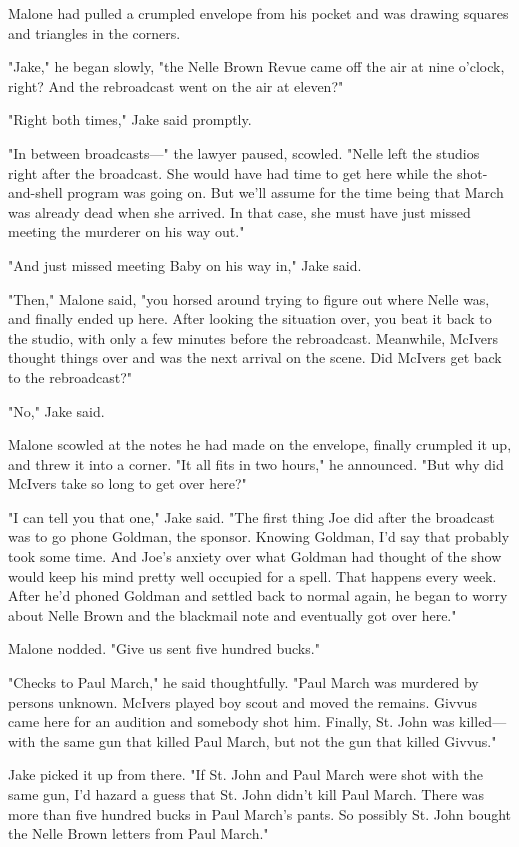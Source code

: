 \documentclass{novel}
\begin{document}
Malone had pulled a crumpled envelope from his pocket and was drawing squares and triangles in the corners.

"Jake," he began slowly, "the Nelle Brown Revue came off the air at nine o'clock, right? And the rebroadcast went on the air at eleven?"

"Right both times," Jake said promptly.

"In between broadcasts—" the lawyer paused, scowled. "Nelle left the studios right after the broadcast. She would have had time to get here while the shot-and-shell program was going on. But we'll assume for the time being that March was already dead when she arrived. In that case, she must have just missed meeting the murderer on his way out."

"And just missed meeting Baby on his way in," Jake said.

"Then," Malone said, "you horsed around trying to figure out where Nelle was, and finally ended up here. After looking the situation over, you beat it back to the studio, with only a few minutes before the rebroadcast. Meanwhile, McIvers thought things over and was the next arrival on the scene. Did McIvers get back to the rebroadcast?"

"No," Jake said.

Malone scowled at the notes he had made on the envelope, finally crumpled it up, and threw it into a corner. "It all fits in two hours," he announced. "But why did McIvers take so long to get over here?"

"I can tell you that one," Jake said. "The first thing Joe did after the broadcast was to go phone Goldman, the sponsor. Knowing Goldman, I'd say that probably took some time. And Joe's anxiety over what Goldman had thought of the show would keep his mind pretty well occupied for a spell. That happens every week. After he'd phoned Goldman and settled back to normal again, he began to worry about Nelle Brown and the blackmail note and eventually got over here."

Malone nodded. "Give us sent five hundred bucks."

"Checks to Paul March," he said thoughtfully. "Paul March was murdered by persons unknown. McIvers played boy scout and moved the remains. Givvus came here for an audition and somebody shot him. Finally, St. John was killed—with the same gun that killed Paul March, but not the gun that killed Givvus."

Jake picked it up from there. "If St. John and Paul March were shot with the same gun, I’d hazard a guess that St. John didn’t kill Paul March. There was more than five hundred bucks in Paul March’s pants. So possibly St. John bought the Nelle Brown letters from Paul March."
\end{document}
